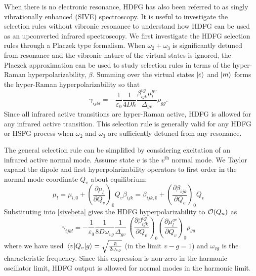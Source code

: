 \documentclass[aip, jcp, reprint, twocolumn]{revtex4-2}
\begin{document}
When there is no electronic resonance, HDFG has also been referred to as singly vibrationally enhanced (SIVE) spectroscopy. \cite{RN352}
It is useful to investigate the selection rules without vibronic resonance to understand how HDFG can be used as an upconverted infrared spectroscopy.
We first investigate the HDFG selection rules through a Placzek type formalism.
When $\omega_2+\omega_3$ is significantly detuned from resonance and the vibronic nature of the virtual states is ignored, the Placzek approximation can be used to study selection rules in terms of the hyper-Raman hyperpolarizability, $\beta$. \cite{Placzek1934, Long1970, Altmann1982}
Summing over the virtual states $\ket{e}$ and $\ket{m}$ forms the hyper-Raman hyperpolarizability so that\cite{Long1970} 
\begin{equation}\label{sivebeta}
	\gamma_{ijkl} =	-\frac{1}{\varepsilon_0} \frac{1}{4D \hbar}\frac{\beta^{vg}_{ijk} \mu^{gv}_{l}}{\Delta_{gv}} \rho_{gg}.
\end{equation}
Since all infrared active transitions are hyper-Raman active, HDFG is allowed for any infrared active transition. \cite{Andrews1978}
This selection rule is generally valid for any HDFG or HSFG process when $\omega_2$ and $\omega_3$ are sufficiently detuned from any resonance.

The general selection rule can be simplified by considering excitation of an infrared active normal mode.  
Assume state $v$ is the $v^{\text{th}}$ normal mode.
We Taylor expand the dipole and first hyperpolarizability operators to first order in the normal mode coordinate $Q_v$ about equilibrium:\cite{Long1970, Shen90}
\begin{subequations}
	\begin{equation}
		\mu_l = \mu_{l,0} + \left(\frac{\partial \mu_l}{\partial Q_v}\right)_0 Q_v 
	\end{equation}
	\begin{equation}
		\beta_{ijk} = \beta_{ijk,0} + \left(\frac{\partial \beta_{ijk}}{\partial Q_v}\right)_0 Q_v
	\end{equation}
\end{subequations}
Substituting into \autoref{sivebeta} gives the HDFG hyperpolarizability to $\order{Q_n}$ as \begin{equation}\label{SIVEselection}
	\gamma_{ijkl} =	-\frac{1}{\varepsilon_0} \frac{1}{8D \omega_{vg}}  \frac{1}{{\Delta_{gv}}} \ \left(\frac{\partial \beta^{vg}_{ijk}}{\partial Q_v}\right)_0 \left({\frac{\partial \mu^{gv}_{l}}{\partial Q_v}}\right)_0  \rho_{gg}
\end{equation}
where we have used $\mel{v}{Q_v}{g} = \sqrt{\frac{\hbar}{2\omega_{vg}}}$ (in the limit $v-g = 1$) and $\omega_{vg}$ is the characteristic frequency.\cite{RN459}
Since this expression is non-zero in the harmonic oscillator limit, HDFG output is allowed for normal modes in the harmonic limit. 
\end{document}
